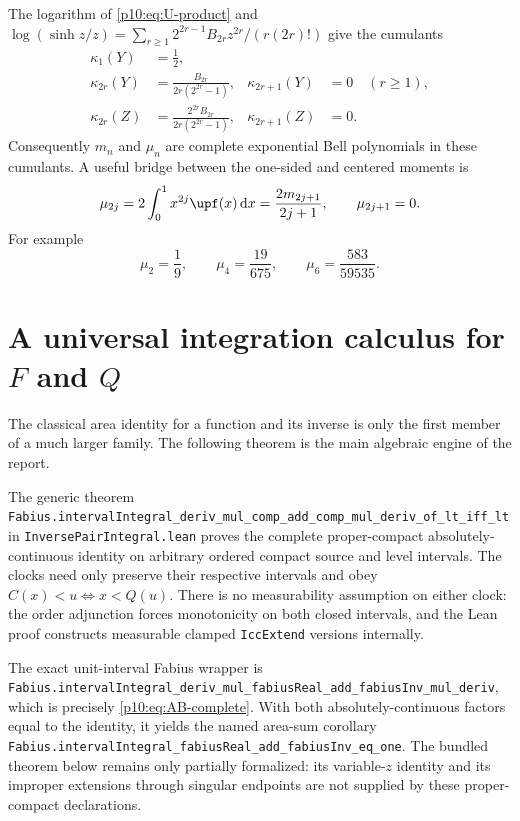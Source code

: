 \documentclass[11pt,oneside]{article}
\theoremstyle{definition}
\theoremstyle{remark}
\newcommand{\F}{F}
\newcommand{\Q}{Q}
\newcommand{\dd}{\,\mathrm d}
\newcommand{\1}{\mathbf 1}
\begin{document}
The logarithm of \cref{p10:eq:U-product} and
\(
 \log(\sinh z/z)
 =\sum_{r\ge1}2^{2r-1}B_{2r}z^{2r}/(r(2r)!)
\)
give the cumulants
\begin{align}
 \kappa_1(Y)&=\frac12,\nonumber\\
 \kappa_{2r}(Y)&=\frac{B_{2r}}{2r(2^{2r}-1)},
 &\kappa_{2r+1}(Y)&=0\quad(r\ge1),\label{p10:eq:Y-cumulants}\\
 \kappa_{2r}(Z)&=\frac{2^{2r}B_{2r}}{2r(2^{2r}-1)},
 &\kappa_{2r+1}(Z)&=0.\label{p10:eq:Z-cumulants}
\end{align}
Consequently \(m_n\) and \(\mu_n\) are complete exponential Bell polynomials in
these cumulants.  A useful bridge between the one-sided and centered moments is
\begin{equation}\label{p10:eq:mu-m-relation}
 \mu_{2j}
 =2\int_0^1x^{2j}\upf(x)\dd x
 =\frac{2m_{2j+1}}{2j+1},
 \qquad \mu_{2j+1}=0.
\end{equation}
For example
\begin{equation}\label{p10:eq:first-central-moments}
 \mu_2=\frac19,\qquad
 \mu_4=\frac{19}{675},\qquad
 \mu_6=\frac{583}{59535}.
\end{equation}

\section{A universal integration calculus for \texorpdfstring{\(\F\)}{F} and
\texorpdfstring{\(\Q\)}{Q}}

The classical area identity for a function and its inverse is only the first member of
a much larger family.  The following theorem is the main algebraic engine of the report.

\begin{statusbox}
The generic theorem
\nolinkurl{Fabius.intervalIntegral_deriv_mul_comp_add_comp_mul_deriv_of_lt_iff_lt}
in \texttt{InversePairIntegral.lean} proves the complete proper-compact
absolutely-continuous identity on arbitrary ordered compact source and level intervals.
The clocks need only preserve their respective intervals and obey
\(C(x)<u\Longleftrightarrow x<Q(u)\).  There is no measurability assumption on either
clock: the order adjunction forces monotonicity on both closed intervals, and the Lean
proof constructs measurable clamped \texttt{IccExtend} versions internally.

The exact unit-interval Fabius wrapper is
\nolinkurl{Fabius.intervalIntegral_deriv_mul_fabiusReal_add_fabiusInv_mul_deriv},
which is precisely \cref{p10:eq:AB-complete}.  With both absolutely-continuous factors
equal to the identity, it yields the named area-sum corollary
\nolinkurl{Fabius.intervalIntegral_fabiusReal_add_fabiusInv_eq_one}.  The bundled theorem
below remains only partially formalized: its variable-\(z\) identity and its improper
extensions through singular endpoints are not supplied by these proper-compact
declarations.
\end{statusbox}
\end{document}
